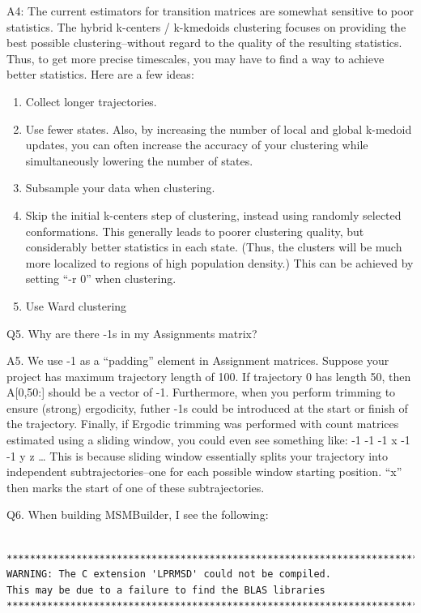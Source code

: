 \documentclass[12pt]{article}
\begin{document}
A4:  The current estimators for transition matrices are somewhat sensitive to poor statistics.  The hybrid k-centers / k-kmedoids clustering focuses on providing the best possible clustering--without regard to the quality of the resulting statistics.  Thus, to get more precise timescales, you may have to find a way to achieve better statistics.  Here are a few ideas:

\begin{enumerate}
 \item Collect longer trajectories.
 \item Use fewer states.  Also, by increasing the number of local and global k-medoid updates, you can often increase the accuracy of your clustering while simultaneously lowering the number of states.  
 \item Subsample your data when clustering.
 \item Skip the initial k-centers step of clustering, instead using randomly selected conformations.  This generally leads to poorer clustering quality, but considerably better statistics in each state.  (Thus, the clusters will be much more localized to regions of high population density.)  This can be achieved by setting “-r 0” when clustering.  
 \item Use Ward clustering
\end{enumerate}

\vspace{5mm}

Q5.  Why are there -1s in my Assignments matrix?

A5.  We use -1 as a “padding” element in Assignment matrices. Suppose your project has maximum trajectory length of 100.  If trajectory 0 has length 50, then A[0,50:] should be a vector of -1.  Furthermore, when you perform trimming to ensure (strong) ergodicity, futher -1s could be introduced at the start or finish of the trajectory.  Finally, if Ergodic trimming was performed with count matrices estimated using a sliding window, you could even see something like:
-1 -1 -1 x -1 -1 y z …
This is because sliding window essentially splits your trajectory into independent subtrajectories--one for each possible window starting position.  “x” then marks the start of one of these subtrajectories.

\vspace{5mm}

Q6.  When building MSMBuilder, I see the following: 
\begin{verbatim}
 ***************************************************************************
WARNING: The C extension 'LPRMSD' could not be compiled.
This may be due to a failure to find the BLAS libraries
***************************************************************************
\end{verbatim}
\end{document}
